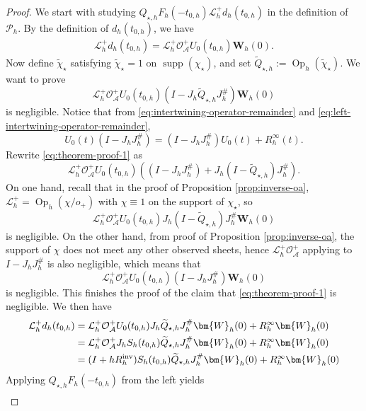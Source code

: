 \documentclass[11pt,reqno]{amsart}
\newcommand{\Op}{\operatorname{Op}}
\numberwithin{equation}{section}
\begin{document}
\begin{proof}
We start with studying $Q_{\star,h}F_h(-t_{0,h})\mathcal L_h^+d_h(t_{0,h})$ in the definition of $\mathscr P_h$. By the definition of $d_h(t_{0,h})$, we have
\begin{align*}
    \mathcal L_h^+d_h(t_{0,h}) = \mathcal L_h^+\mathcal O_{\mathcal A}^+U_0(t_{0,h})\bm{W}_h(0).
\end{align*}
Now define $\widetilde{\chi}_\star$ satisfying $\widetilde{\chi}_\star=1$ on $\operatorname{supp}(\chi_\star)$, and set $\widetilde Q_{\star,h}:=\Op_h(\widetilde\chi_\star)$. We want to prove 
\begin{equation}\label{eq:theorem-proof-1}
    \mathcal L_h^+\mathcal O_{\mathcal A}^+U_0(t_{0,h})(I-J_h\widetilde{Q}_{\star,h}J_h^\#)\bm{W}_h(0)
\end{equation}
is negligible. Notice that from \eqref{eq:intertwining-operator-remainder} and \eqref{eq:left-intertwining-operator-remainder},
$$
    U_0(t)(I-J_hJ_h^\#) = (I-J_hJ_h^\#)U_0(t)+R_h^\infty(t).
$$
Rewrite \eqref{eq:theorem-proof-1} as
$$
    \mathcal L_h^+\mathcal O_{\mathcal A}^+U_0(t_{0,h})\left((I-J_hJ_h^\#) + J_h(I-\widetilde{Q}_{\star,h})J_h^\#\right).
$$
On one hand, recall that in the proof of Proposition \ref{prop:inverse-oa}, $\mathcal L_h^+=\Op_h(\chi/o_+)$ with $\chi\equiv 1$ on the support of $\chi_\star$, so 
$$
    \mathcal L_h^+\mathcal O_{\mathcal A}^+U_0(t_{0,h})J_h(I-\widetilde{Q}_{\star,h})J_h^\#\bm{W}_h(0)
$$
is negligible. On the other hand, from proof of Proposition \ref{prop:inverse-oa}, the support of $\chi$ does not meet any other observed sheets, hence $\mathcal L_h^+\mathcal O_{\mathcal A}^+$ applying to $I-J_hJ_h^\#$ is also negligible, which means that
$$
    \mathcal L_h^+\mathcal O_{\mathcal A}^+U_0(t_{0,h})(I-J_hJ_h^\#)\bm{W}_h(0)
$$
is negligible. This finishes the proof of the claim that \eqref{eq:theorem-proof-1} is negligible. We then have
\begin{align*}
    \mathcal L_h^+d_h(t_{0,h}) &= \mathcal L_h^+\mathcal O_{\mathcal A}^+U_0(t_{0,h})J_h\widetilde{Q}_{\star,h}J_h^\#\bm{W}_h(0)+R_h^\infty\bm{W}_h(0)\\ 
    &= \mathcal L_h^+\mathcal O_{\mathcal A}^+J_hS_h(t_{0,h})\widetilde{Q}_{\star,h}J_h^\#\bm{W}_h(0)+R_h^\infty\bm{W}_h(0)\\
    &= (I+hR_h^{\rm inv})S_h(t_{0,h})\widetilde{Q}_{\star,h}J_h^\#\bm{W}_h(0)+R_h^\infty\bm{W}_h(0)
\end{align*}
Applying $Q_{\star,h}F_h(-t_{0,h})$ from the left yields
\begin{align*}

\end{align*}
\end{proof}
\end{document}

